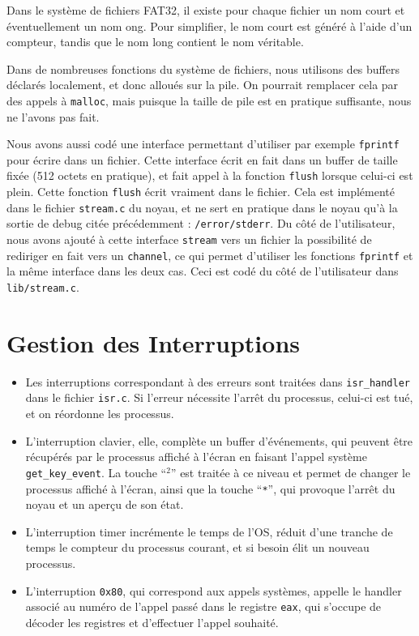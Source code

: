 \documentclass[a4paper,10pt, french]{article}
\newcommand{\code}[1]{\texttt{#1}}
\begin{document}
Dans le système de fichiers FAT32, il existe pour chaque fichier un nom court et éventuellement un nom ong. Pour simplifier, le nom court est généré à l'aide
d'un compteur, tandis que le nom long contient le nom véritable.

Dans de nombreuses fonctions du système de fichiers, nous utilisons des buffers déclarés localement, et donc alloués sur la pile.
On pourrait remplacer cela par des appels à \code{malloc}, mais puisque la taille de pile est en pratique suffisante, nous ne l'avons pas fait.

Nous avons aussi codé une interface permettant d'utiliser par exemple \code{fprintf} pour écrire dans un fichier. Cette interface
écrit en fait dans un buffer de taille fixée (512 octets en pratique), et fait appel à la fonction \code{flush} lorsque celui-ci est plein.
Cette fonction \code{flush} écrit vraiment dans le fichier.
Cela est implémenté dans le fichier \code{stream.c} du noyau, et ne sert en pratique dans le noyau qu'à la sortie
de debug citée précédemment : \code{/error/stderr}.
Du côté de l'utilisateur, nous avons ajouté à cette interface \code{stream} vers un fichier la possibilité de rediriger en fait
vers un \code{channel}, ce qui permet d'utiliser les fonctions \code{fprintf} et la même interface dans les deux cas.
Ceci est codé du côté de l'utilisateur dans \code{lib/stream.c}.

\section{Gestion des Interruptions}
\begin{itemize}
 \item Les interruptions correspondant à des erreurs sont traitées dans \code{isr\_handler} dans le fichier \code{isr.c}.
Si l'erreur nécessite l'arrêt du processus, celui-ci est tué, et on réordonne les processus.
 \item L'interruption clavier, elle, complète un buffer d'événements, qui peuvent être récupérés par le processus affiché à l'écran
en faisant l'appel système \code{get\_key\_event}. La touche ``$^2$'' est traitée à ce niveau et permet de changer le processus affiché
à l'écran, ainsi que la touche ``\code{*}'', qui provoque l'arrêt du noyau et un aperçu de son état.
 \item L'interruption timer incrémente le temps de l'OS, réduit d'une tranche de temps le compteur du processus courant,
et si besoin élit un nouveau processus.
 \item L'interruption \code{0x80}, qui correspond aux appels systèmes, appelle le handler associé au numéro de l'appel
passé dans le registre \code{eax}, qui s'occupe de décoder les registres et d'effectuer l'appel souhaité.
\end{itemize}
\end{document}
